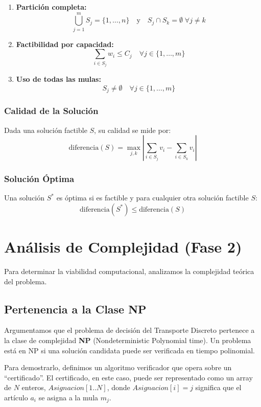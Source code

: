 \documentclass[12pt, a4paper]{article}
\begin{document}
    \begin{enumerate}
        \item \textbf{Partición completa:}
        \[
        \bigcup_{j=1}^{m} S_j = \{1,\ldots,n\} \quad \text{y} \quad S_j \cap S_k = \emptyset \; \forall j \neq k
        \]

        \item \textbf{Factibilidad por capacidad:}
        \[
        \sum_{i \in S_j} w_i \leq C_j \quad \forall j \in \{1,\ldots,m\}
        \]

        \item \textbf{Uso de todas las mulas:}
        \[
        S_j \neq \emptyset \quad \forall j \in \{1,\ldots,m\}
        \]
    \end{enumerate}

    \subsubsection{Calidad de la Solución}
    Dada una solución factible $S$, su calidad se mide por:
    \[
    \text{diferencia}(S) = \max_{j,k} \left| \sum_{i \in S_j} v_i - \sum_{i \in S_k} v_i \right|
    \]

    \subsubsection{Solución Óptima}
    Una solución $S^*$ es óptima si es factible y para cualquier otra solución factible $S$:
    \[
    \text{diferencia}(S^*) \leq \text{diferencia}(S)
    \]

    \section{Análisis de Complejidad (Fase 2)}
    Para determinar la viabilidad computacional, analizamos la complejidad teórica del problema.

    \subsection{Pertenencia a la Clase NP}
    Argumentamos que el problema de decisión del Transporte Discreto pertenece a la clase de complejidad \textbf{NP} (Nondeterministic Polynomial time). Un problema está en NP si una solución candidata puede ser verificada en tiempo polinomial.

    Para demostrarlo, definimos un algoritmo verificador que opera sobre un ``certificado''. El certificado, en este caso, puede ser representado como un array de $N$ enteros, $Asignacion[1..N]$, donde $Asignacion[i] = j$ significa que el artículo $a_i$ se asigna a la mula $m_j$.
\end{document}
